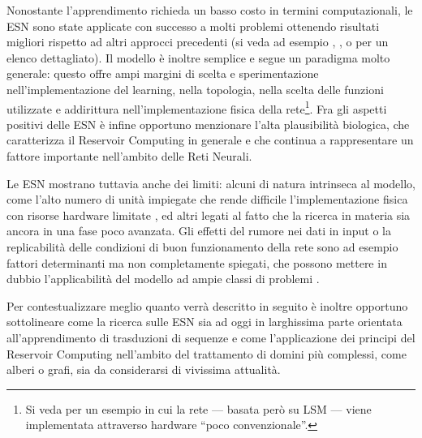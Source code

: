

Nonostante l'apprendimento richieda un basso costo in termini computazionali, le ESN sono state applicate con successo a molti problemi ottenendo risultati migliori rispetto ad altri approcci precedenti (si veda ad esempio \cite{Jaeger:HarnessingNonlinearity}, \cite[pag.~8]{Schrauwen:AnOverview}, o \cite[pag.~5]{Lukosevicius:ESN-Survey} per un elenco dettagliato). Il modello è inoltre semplice e segue un paradigma molto generale: questo offre ampi margini di scelta e sperimentazione nell'implementazione del learning, nella topologia, nella scelta delle funzioni utilizzate e addirittura nell'implementazione fisica della rete\footnote{Si veda \cite{Fernando:PatternRecognition} per un esempio in cui la rete --- basata però su LSM --- viene implementata attraverso hardware ``poco convenzionale''.}. Fra gli aspetti positivi delle ESN è infine opportuno menzionare l'alta plausibilità biologica, che caratterizza il Reservoir Computing in generale e che continua a rappresentare un fattore importante nell'ambito delle Reti Neurali.

Le ESN mostrano tuttavia anche dei limiti: alcuni di natura intrinseca al modello, come l'alto numero di unità impiegate che rende difficile l'implementazione fisica con risorse hardware limitate \cite{Prokhorov:AppealAndChallenges}, ed altri legati al fatto che la ricerca in materia sia ancora in una fase poco avanzata. Gli effetti del rumore nei dati in input o la replicabilità delle condizioni di buon funzionamento della rete sono ad esempio fattori determinanti ma non completamente spiegati, che possono mettere in dubbio l'applicabilità del modello ad ampie classi di problemi \cite{Prokhorov:AppealAndChallenges}.

Per contestualizzare meglio quanto verrà descritto in seguito è inoltre opportuno sottolineare come la ricerca sulle ESN sia ad oggi in larghissima parte orientata all'apprendimento di trasduzioni di sequenze e come l'applicazione dei principi del Reservoir Computing nell'ambito del trattamento di domini più complessi, come alberi o grafi, sia da considerarsi di vivissima attualità.





